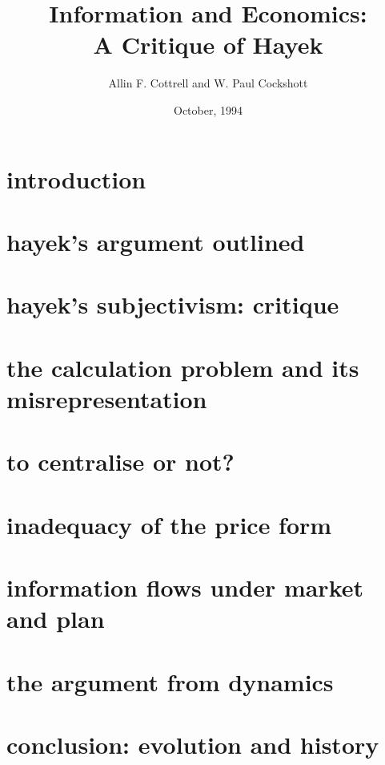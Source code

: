 \frenchspacing
{}



\title{\sc Information and Economics: \\
A Critique of Hayek}
\author{Allin F. Cottrell and W. Paul Cockshott}
\date{October, 1994}
\maketitle



\section{introduction}

\section{hayek's argument outlined}

\section{hayek's subjectivism: critique}

\section{the calculation problem and its misrepresentation}

\section{to centralise or not?}

\section{inadequacy of the price form}

\section{information flows under market and plan}

\section{the argument from dynamics}

\section{conclusion: evolution and history}


